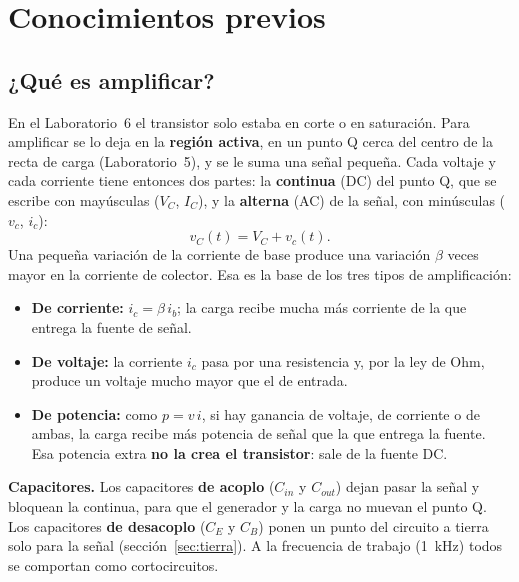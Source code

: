 \documentclass[11pt,a4paper]{article}
\begin{document}
\FloatBarrier
\section{Conocimientos previos}

\subsection{¿Qué es amplificar?}
En el Laboratorio~6 el transistor solo estaba en corte o en saturación. Para amplificar se lo
deja en la \textbf{región activa}, en un punto Q cerca del centro de la recta de carga
(Laboratorio~5), y se le suma una señal pequeña. Cada voltaje y cada corriente tiene entonces
dos partes: la \textbf{continua} (DC) del punto Q, que se escribe con mayúsculas ($V_C$,
$I_C$), y la \textbf{alterna} (AC) de la señal, con minúsculas ($v_c$, $i_c$):
\begin{equation*}
  v_C(t) = V_C + v_c(t).
\end{equation*}
Una pequeña variación de la corriente de base produce una variación $\beta$ veces mayor en la
corriente de colector. Esa es la base de los tres tipos de amplificación:
\begin{itemize}
  \item \textbf{De corriente:} $i_c = \beta\, i_b$; la carga recibe mucha más corriente de la
        que entrega la fuente de señal.
  \item \textbf{De voltaje:} la corriente $i_c$ pasa por una resistencia y, por la ley de Ohm,
        produce un voltaje mucho mayor que el de entrada.
  \item \textbf{De potencia:} como $p = v\,i$, si hay ganancia de voltaje, de corriente o de
        ambas, la carga recibe más potencia de señal que la que entrega la fuente. Esa potencia
        extra \textbf{no la crea el transistor}: sale de la fuente DC.
\end{itemize}

\noindent\textbf{Capacitores.} Los capacitores \textbf{de acoplo} ($C_{in}$ y $C_{out}$)
dejan pasar la señal y bloquean la continua, para que el generador y la carga no muevan el
punto Q. Los capacitores \textbf{de desacoplo} ($C_E$ y $C_B$) ponen un punto del circuito a
tierra solo para la señal (sección~\ref{sec:tierra}). A la frecuencia de trabajo
(\qty{1}{\kilo\hertz}) todos se comportan como cortocircuitos.
\end{document}
